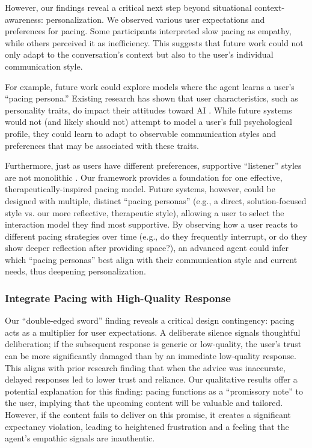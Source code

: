 However, our findings reveal a critical next step beyond situational context-awareness: personalization. We observed various user expectations and preferences for pacing. Some participants interpreted slow pacing as empathy, while others perceived it as inefficiency. 
This suggests that future work could not only adapt to the conversation's context but also to the user's individual communication style.

For example, future work could explore models where the agent learns a user's ``pacing persona.'' Existing research has shown that user characteristics, such as personality traits, do impact their attitudes toward AI \cite{stein2024attitudes, kaplan2019relationship}. While future systems would not (and likely should not) attempt to model a user's full psychological profile, they could learn to adapt to observable communication styles and preferences that may be associated with these traits. 

Furthermore, just as users have different preferences, supportive ``listener'' styles are not monolithic \cite{Zhang2022You}. Our framework provides a foundation for one effective, therapeutically-inspired pacing model. Future systems, however, could be designed with multiple, distinct ``pacing personas'' (e.g., a direct, solution-focused style vs. our more reflective, therapeutic style), allowing a user to select the interaction model they find most supportive. By observing how a user reacts to different pacing strategies over time (e.g., do they frequently interrupt, or do they show deeper reflection after providing space?), an advanced agent could infer which ``pacing personas'' best align with their communication style and current needs, thus deepening personalization.


\subsubsection{Integrate Pacing with High-Quality Response}
\label{subsubsec:high-quality}
Our ``double-edged sword'' finding reveals a critical design contingency: pacing acts as a multiplier for user expectations. A deliberate silence signals thoughtful deliberation; if the subsequent response is generic or low-quality, the user's trust can be more significantly damaged than by an immediate low-quality response. This aligns with prior research \cite{park2019slow} finding that when the advice was inaccurate, delayed responses led to lower trust and reliance. Our qualitative results offer a potential explanation for this finding: pacing functions as a ``promissory note'' to the user, implying that the upcoming content will be valuable and tailored. However, if the content fails to deliver on this promise, it creates a significant expectancy violation, leading to heightened frustration and a feeling that the agent's empathic signals are inauthentic.

